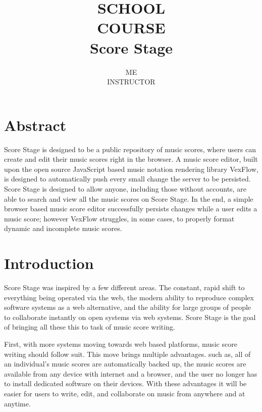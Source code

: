 \documentclass[letterpaper,12pt]{article}
\title{
    \vfill
    {\Large SCHOOL} \\
    {\Large COURSE} \\[0.75em]
    {\Huge Score Stage} \\
}
\author{
    ME \\
    INSTRUCTOR
}
\begin{document}
\begin{titlepage}
    \maketitle
    \vfill
    \thispagestyle{empty}
\end{titlepage}

\section*{Abstract}

Score Stage is designed to be a public repository of music scores, where users can create and edit their music scores
right in the browser. A music score editor, built upon the open source JavaScript based music notation rendering library
VexFlow, is designed to automatically push every small change the server to be persisted. Score Stage is designed to
allow anyone, including those without accounts, are able to search and view all the music scores on Score Stage. In the
end, a simple browser based music score editor successfully persists changes while a user edits a music score; however
VexFlow struggles, in some cases, to properly format dynamic and incomplete music scores.

\thispagestyle{empty}
\newpage

\tableofcontents
\listoffigures

\thispagestyle{empty}
\newpage


\section{Introduction}

Score Stage was inspired by a few different areas. The constant, rapid shift to everything being operated via the web,
the modern ability to reproduce complex software systems as a web alternative, and the ability for large groups of
people to collaborate instantly on open systems via web systems. Score Stage is the goal of bringing all these this to
task of music score writing.

First, with more systems moving towards web based platforms, music score writing should follow suit. This move brings
multiple advantages. such as, all of an individual's music scores are automatically backed up, the music scores are
available from any device with internet and a browser, and the user no longer has to install dedicated software on their
devices. With these advantages it will be easier for users to write, edit, and collaborate on music from anywhere and at
anytime.
\end{document}
